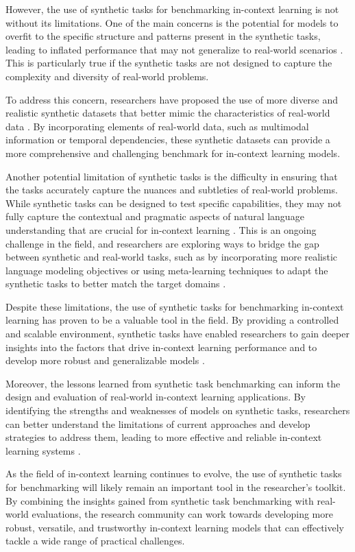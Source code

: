 \documentclass[11pt]{article}
\begin{document}
However, the use of synthetic tasks for benchmarking in-context learning is not without its limitations. One of the main concerns is the potential for models to overfit to the specific structure and patterns present in the synthetic tasks, leading to inflated performance that may not generalize to real-world scenarios \cite{ref306}. This is particularly true if the synthetic tasks are not designed to capture the complexity and diversity of real-world problems.

To address this concern, researchers have proposed the use of more diverse and realistic synthetic datasets that better mimic the characteristics of real-world data \cite{ref307}. By incorporating elements of real-world data, such as multimodal information or temporal dependencies, these synthetic datasets can provide a more comprehensive and challenging benchmark for in-context learning models.

Another potential limitation of synthetic tasks is the difficulty in ensuring that the tasks accurately capture the nuances and subtleties of real-world problems. While synthetic tasks can be designed to test specific capabilities, they may not fully capture the contextual and pragmatic aspects of natural language understanding that are crucial for in-context learning \cite{ref278}. This is an ongoing challenge in the field, and researchers are exploring ways to bridge the gap between synthetic and real-world tasks, such as by incorporating more realistic language modeling objectives or using meta-learning techniques to adapt the synthetic tasks to better match the target domains \cite{ref308}.

Despite these limitations, the use of synthetic tasks for benchmarking in-context learning has proven to be a valuable tool in the field. By providing a controlled and scalable environment, synthetic tasks have enabled researchers to gain deeper insights into the factors that drive in-context learning performance and to develop more robust and generalizable models \cite{ref183}.

Moreover, the lessons learned from synthetic task benchmarking can inform the design and evaluation of real-world in-context learning applications. By identifying the strengths and weaknesses of models on synthetic tasks, researchers can better understand the limitations of current approaches and develop strategies to address them, leading to more effective and reliable in-context learning systems \cite{ref309}.

As the field of in-context learning continues to evolve, the use of synthetic tasks for benchmarking will likely remain an important tool in the researcher's toolkit. By combining the insights gained from synthetic task benchmarking with real-world evaluations, the research community can work towards developing more robust, versatile, and trustworthy in-context learning models that can effectively tackle a wide range of practical challenges.
\end{document}
